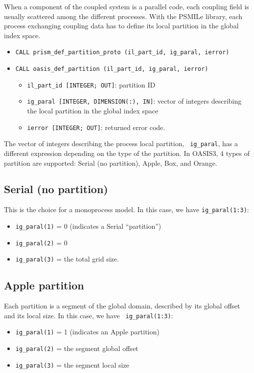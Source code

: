When a component of the coupled system is a parallel code, each
coupling field is usually scattered among the different
processes. With the PSMILe library, each process exchanging coupling data has to
define its local partition in the global index space.

\begin{itemize}


\item {\tt CALL prism\_def\_partition\_proto (il\_part\_id, ig\_paral, ierror)}
\item {\tt CALL oasis\_def\_partition        (il\_part\_id, ig\_paral, ierror)}

   \begin{itemize}
   \item {\tt il\_part\_id [INTEGER; OUT]}: partition ID 
   \item {\tt ig\_paral [INTEGER, DIMENSION(:), IN]}: vector of
   integers describing the local partition in the global index space
   \item {\tt ierror [INTEGER; OUT]}: returned error code.
   \end{itemize}
\end{itemize} 

The vector of integers describing the process local partition, {\tt
ig\_paral}, has a different expression depending on the type of the
partition. In OASIS3, 4 types of partition are supported: Serial (no
partition), Apple, Box, and Orange.
 
\subsection{Serial (no partition)}

This is the choice for a monoprocess model. In this case, we have 
{\tt ig\_paral(1:3)}:
\begin{itemize}
 \item {\tt ig\_paral(1)} = 0 (indicates a Serial ``partition'')
 \item {\tt ig\_paral(2)} = 0
 \item {\tt ig\_paral(3)} = the total grid size.
\end{itemize}

\subsection{Apple partition} 

Each partition is a segment of the global domain, described by its
global offset and its local size. In this case, we have {\tt
ig\_paral(1:3)}:
\begin{itemize}
 \item {\tt ig\_paral(1)} = 1 (indicates an Apple partition)
 \item {\tt ig\_paral(2)} = the segment global offset
 \item {\tt ig\_paral(3)} = the segment local size
\end{itemize}


